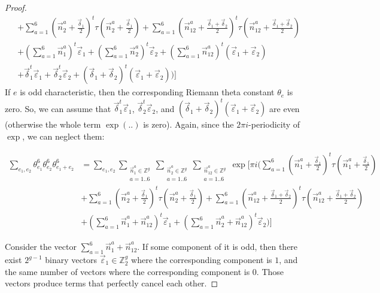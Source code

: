 \documentclass{article}
\newcommand{\ZZ}{\mathbb{Z}}
\newcommand{\de}{\delta}
\newcommand{\ep}{\varepsilon}
\theoremstyle{plain}
\theoremstyle{definition}
\begin{document}
\begin{proof}
\begin{align}
                &+ \sum_{a=1}^6 (\vec{n}_2^a+\frac{{\vec{\de}}_1}{2})^t \tau (\vec{n}_2^a+\frac{{\vec{\de}}_1}{2}) + 
                \sum_{a=1}^6 (\vec{n}_{12}^a+\frac{{\vec{\de}}_1 + {\vec{\de}}_2}{2})^t \tau (\vec{n}_{12}^a+\frac{{\vec{\de}}_1 + {\vec{\de}}_2}{2}) \nonumber \\
                &+ (\sum_{a=1}^6 \vec{n}_1^a)^t {\vec{\ep}}_1 + 
                (\sum_{a=1}^6 \vec{n}_2^a)^t {\vec{\ep}}_2 +
                (\sum_{a=1}^6 \vec{n}_{12}^a)^t ({\vec{\ep}}_1 + {\vec{\ep}}_2) \nonumber \\
                &+ {\vec{\de}}_1^t {\vec{\ep}}_1 + {\vec{\de}}_2^t {\vec{\ep}}_2 + 
                ({\vec{\de}}_1 + {\vec{\de}}_2)^t ({\vec{\ep}}_1 + {\vec{\ep}}_2)
            \Big) \Big]
        \end{align}
        If $e$ is odd characteristic, then the corresponding 
        Riemann theta constant $\theta_e$ is zero.
        So, we can assume that ${\vec{\de}}_1^t {\vec{\ep}}_1$, ${\vec{\de}}_2^t {\vec{\ep}}_2$, and
        $({\vec{\de}}_1 + {\vec{\de}}_2)^t ({\vec{\ep}}_1 + {\vec{\ep}}_2)$ are even (otherwise the whole term
        $\exp(..)$ is zero).
        Again, since the $2\pi i$-periodicity of $\exp$, we can neglect them:

        \begin{align}
            \sum_{e_1, e_2} \theta^6_{e_1} \theta^6_{e_2} \theta^6_{e_1+e_2}
            &= \sum_{e_1, e_2} 
            \sum_{\substack{\vec{n}_1^a \in \ZZ^g \\ a=1..6}}
            \sum_{\substack{\vec{n}_2^a \in \ZZ^g \\ a=1..6}}
            \sum_{\substack{\vec{n}_{12}^a \in \ZZ^g \\ a=1..6}}
            \exp \Big [ \pi i \Big (
                \sum_{a=1}^6 (\vec{n}_1^a+\frac{{\vec{\de}}_1}{2})^t \tau (\vec{n}_1^a+\frac{{\vec{\de}}_1}{2}) \nonumber \\
                &+ \sum_{a=1}^6 (\vec{n}_2^a+\frac{{\vec{\de}}_1}{2})^t \tau (\vec{n}_2^a+\frac{{\vec{\de}}_1}{2}) + 
                \sum_{a=1}^6 (\vec{n}_{12}^a+\frac{{\vec{\de}}_1 + {\vec{\de}}_2}{2})^t \tau (\vec{n}_{12}^a+\frac{{\vec{\de}}_1 + {\vec{\de}}_2}{2}) \nonumber \\
                &+ (\sum_{a=1}^6 \vec{n}_1^a + \vec{n}_{12}^a)^t {\vec{\ep}}_1 + 
                (\sum_{a=1}^6 \vec{n}_2^a + \vec{n}_{12}^a)^t {\vec{\ep}}_2
            \Big) \Big]
        \end{align}

        Consider the vector $\sum_{a=1}^6 \vec{n}_1^a + \vec{n}_{12}^a$. If some component of it is odd, 
        then there exist $2^{g-1}$ binary vectors ${\vec{\ep}}_1 \in \ZZ_2^g$ 
        where the corresponding component is $1$, and the same number of vectors where 
        the corresponding component is $0$. Those vectors produce 
        terms that perfectly cancel each other.


\end{proof}
\end{document}

